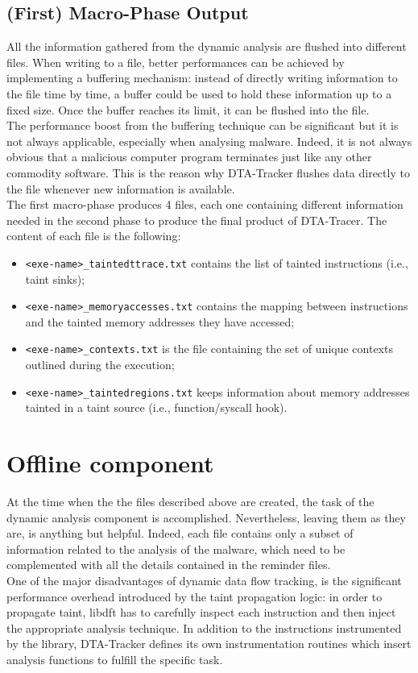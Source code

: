 \documentclass[LaM,binding=0.6cm]{sapthesis}
\begin{document}
\subsection{(First) Macro-Phase Output}
All the information gathered from the dynamic analysis are flushed into different files. When writing to a file, better performances can be achieved by implementing a buffering mechanism: instead of directly writing information to the file time by time, a buffer could be used to hold these information up to a fixed size. Once the buffer reaches its limit, it can be flushed into the file.\\
The performance boost from the buffering technique can be significant but it is not always applicable, especially when analysing malware. Indeed, it is not always obvious that a malicious computer program terminates just like any other commodity software. This is the reason why DTA-Tracker flushes data directly to the file whenever new information is available.\\

The first macro-phase produces 4 files, each one containing different information needed in the second phase to produce the final product of DTA-Tracer. The content of each file is the following:
\begin{itemize}
\item \texttt{<exe-name>\_taintedttrace.txt} contains the list of tainted instructions (i.e., taint sinks);
\item \texttt{<exe-name>\_memoryaccesses.txt} contains the mapping between instructions and the tainted memory addresses they have accessed;
\item \texttt{<exe-name>\_contexts.txt} is the file containing the set of unique contexts outlined during the execution;
\item \texttt{<exe-name>\_taintedregions.txt} keeps information about memory addresses tainted in a taint source (i.e., function/syscall hook).
\end{itemize}

\section{Offline component}
At the time when the the files described above are created, the task of the dynamic analysis component is accomplished. Nevertheless, leaving them as they are, is anything but helpful. Indeed, each file contains only a subset of information related to the analysis of the malware, which need to be complemented with all the details contained in the reminder files.\\
One of the major disadvantages of dynamic data flow tracking, is the significant performance overhead introduced by the taint propagation logic: in order to propagate taint, libdft has to carefully inspect each instruction and then inject the appropriate analysis technique. In addition to the instructions instrumented by the library, DTA-Tracker defines its own instrumentation routines which insert analysis functions to fulfill the specific task.\\
\end{document}
